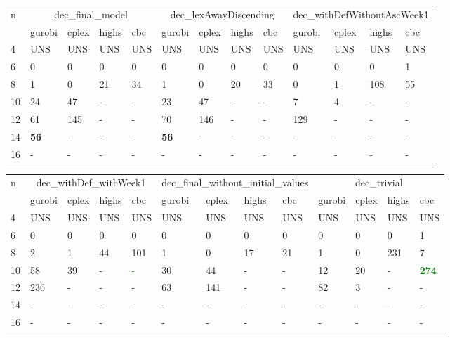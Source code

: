 \documentclass{article}
\begin{document}
\begin{table}[H]

\begin{tabular}{| p{0.3cm}|p{0.9cm}|p{0.8cm}|p{0.8cm}|p{0.7cm}|p{0.8cm}|p{0.8cm}|p{0.8cm}|p{0.7cm}|p{0.8cm}|p{0.8cm}|p{0.8cm}|p{0.7cm}|}
 \hline
 \multirow{2}{*}{n} & \multicolumn{4}{|c|}{dec\_final\_model}& \multicolumn{4}{|c|}{dec\_lexAwayDiscending}& \multicolumn{4}{|c|}{dec\_withDefWithoutAscWeek1}\\
 \cline{2-13}
  &  gurobi& cplex & highs & cbc& gurobi& cplex & highs & cbc& gurobi& cplex & highs & cbc\\
 \hline
 4&  UNS& UNS& UNS&   UNS&  UNS& UNS& UNS&  UNS&  UNS& UNS& UNS&   UNS\\
 6&   0& 0&  0&  0&  0& 0& 0&  0&  0& 0& 0&       1\\
 8&   1&  0& 21&   34&  1& 0& 20& 33&  0& 1& 108&      55\\
 10&  24& 47&  -&   -&  23& 47& -& -&  7& 4& -&   -\\
 12&  61&  145&  -& -&  70& 146& -&  -&  129& -& -&     -\\
 14&  \textbf{56}&  -& -&  -&  \textbf{56}& -& -&  -&  -& -& -&   -\\
 16& - & - & - & - & - & -& -& - & - &- &- &-\\

\hline
\end{tabular}
\end{table}

\begin{table}[H]
\centering
\begin{tabular}{| p{0.35cm}|p{0.8cm}|p{0.8cm}|p{0.8cm}|p{0.7cm}|p{0.8cm}|p{0.8cm}|p{0.8cm}|p{0.7cm}|p{0.8cm}|p{0.8cm}|p{0.8cm}|p{0.7cm} | }
 \hline
 \multirow{2}{*}{n} & \multicolumn{4}{|c|}{dec\_withDef\_withWeek1}& \multicolumn{4}{|c|}{dec\_final\_without\_initial\_values}& \multicolumn{4}{|c|}{dec\_trivial}\\
 \cline{2-13}
  &  gurobi& cplex & highs & cbc& gurobi& cplex & highs & cbc& gurobi& cplex & highs & cbc\\
 \hline
 4&  UNS& UNS& UNS&   UNS&  UNS& UNS& UNS&  UNS&  UNS& UNS& UNS&   UNS\\
 6&   0& 0&  0&  0&  0& 0& 0&  0&  0& 0& 0&       1\\
 8&   2&  1& 44&   101&  1& 0& 17& 21&  1& 0& 231&      7\\
 10&  58& 39&-&   \textcolor{green}{-}&  30& 44& -& -&  12& 20& -&   \textcolor{green}{\textbf{274}}\\
 12&  236&  -&  -& -&  63& 141& -&  -&  82& 3& -&     -\\
 14&  -&  -& -&  -&  -& -& -&  -&  -& -& -&   -\\
 16& - & - & - & - & - & -& -& - & - &- &- &-\\

\hline
\end{tabular}
\end{table}
\end{document}
